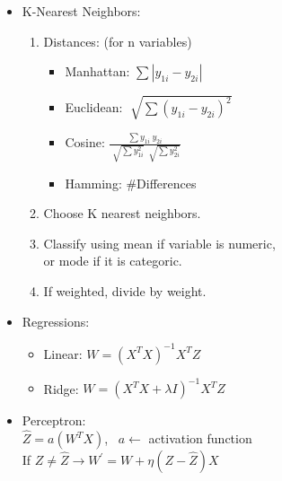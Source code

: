 \documentclass[twocolumn, 10pt]{article}
\begin{document}
\begin{itemize}[leftmargin=*, itemsep=0pt]
    \item K-Nearest Neighbors:
    \begin{enumerate}[topsep=0pt, itemsep=0pt]
        \item Distances: (for n variables)
        \begin{itemize}[topsep=0pt]
            \item Manhattan: $\displaystyle \sum |y_{1i}-y_{2i}|$
            \item Euclidean: $\displaystyle \sqrt[]{\sum (y_{1i}-y_{2i})^2}$
            \item Cosine: $\displaystyle \frac{\sum y_{1i}\ y_{2i}}
            {\sqrt[]{\sum y_{1i}^2}\ \sqrt[]{\sum y_{2i}^2}}$
            \item Hamming: \#Differences
        \end{itemize}
        \item Choose K nearest neighbors.
        \item Classify using mean if variable is numeric, \\
        or mode if it is categoric.
        \item If weighted, divide by weight.
    \end{enumerate}

    \item Regressions:
    \begin{itemize}[topsep=0pt, itemsep=0pt]
        \item Linear: $W=(X^TX)^{-1}X^TZ$
        \item Ridge: $W=(X^TX+\lambda I)^{-1}X^TZ$
    \end{itemize}

    \item Perceptron: \\
    $\hat{Z}=a(W^TX)$, \ $a  \leftarrow$ activation function \\
    If $Z \neq \hat{Z} \longrightarrow W^{'}=W+\eta(Z - \hat{Z})X$  


\end{itemize}
\end{document}
